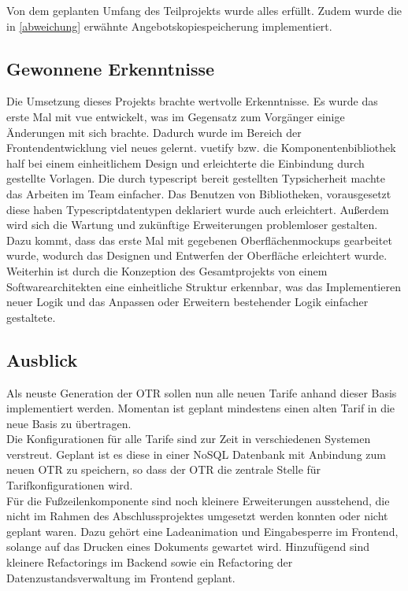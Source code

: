  Von dem geplanten Umfang des Teilprojekts wurde alles erfüllt. Zudem wurde die in \ref{abweichung}  erwähnte Angebotskopiespeicherung implementiert.
\subsection{Gewonnene Erkenntnisse}
\label{erkenntnisse}
Die Umsetzung dieses Projekts brachte wertvolle Erkenntnisse. Es wurde das erste Mal mit \gls{vue} entwickelt, was im Gegensatz zum Vorgänger einige Änderungen mit sich brachte. Dadurch wurde im Bereich der Frontendentwicklung viel neues gelernt. \gls{vuetify} bzw. die Komponentenbibliothek half bei einem einheitlichem Design und erleichterte die Einbindung durch gestellte Vorlagen. Die durch \gls{typescript} bereit gestellten Typsicherheit machte das Arbeiten im Team einfacher. Das Benutzen von Bibliotheken, vorausgesetzt diese haben Typescriptdatentypen deklariert wurde auch erleichtert. Außerdem wird sich die Wartung und zukünftige Erweiterungen problemloser gestalten.\\ 
Dazu kommt, dass das erste Mal mit gegebenen Oberflächenmockups gearbeitet wurde, wodurch das Designen und Entwerfen der Oberfläche erleichtert wurde. Weiterhin ist durch die Konzeption des Gesamtprojekts von einem Softwarearchitekten eine einheitliche Struktur erkennbar, was das Implementieren neuer Logik und das Anpassen oder Erweitern bestehender Logik einfacher gestaltete.
\subsection{Ausblick}
\label{ausblick}
Als neuste Generation der \ac{OTR} sollen nun alle neuen Tarife anhand dieser Basis implementiert werden. Momentan ist geplant mindestens einen alten Tarif in die neue Basis zu übertragen.\\
Die Konfigurationen für alle Tarife sind zur Zeit in verschiedenen Systemen verstreut. Geplant ist es diese in einer NoSQL Datenbank mit Anbindung zum neuen \ac{OTR} zu speichern, so dass der \ac{OTR} die zentrale Stelle für Tarifkonfigurationen wird.\\
Für die Fußzeilenkomponente sind noch kleinere Erweiterungen ausstehend, die nicht im Rahmen des Abschlussprojektes umgesetzt werden konnten oder nicht geplant waren. Dazu gehört eine Ladeanimation und Eingabesperre im Frontend, solange auf das Drucken eines Dokuments gewartet wird. Hinzufügend sind kleinere Refactorings im Backend sowie ein Refactoring der Datenzustandsverwaltung im Frontend geplant.